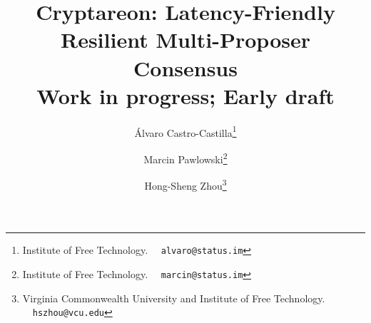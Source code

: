 \documentclass[11pt]{article}
\begin{document}
\title{
Cryptareon: Latency-Friendly Resilient Multi-Proposer Consensus
\\
{\small {\sc Work in progress; Early draft}}
}
\author{
Álvaro Castro-Castilla\footnote{Institute of Free Technology. \ \ \texttt{alvaro@status.im}}
\and
Marcin Pawlowski\footnote{Institute of Free Technology. \ \ \texttt{marcin@status.im}}
\and
Hong-Sheng Zhou\footnote{Virginia Commonwealth University and Institute of Free Technology. \ \ \texttt{hszhou@vcu.edu}}
}

\maketitle





\setcounter{tocdepth}{2}
\setcounter{secnumdepth}{3}
\pagestyle{plain}




\newpage
\small
\tableofcontents
\normalsize

\newpage
{}















\end{document}

